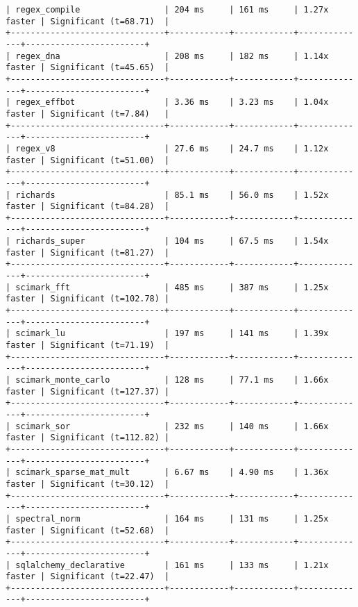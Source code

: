 \begin{code}
\begin{verbatim}
| regex_compile                 | 204 ms     | 161 ms     | 1.27x faster | Significant (t=68.71)  |
+-------------------------------+------------+------------+--------------+------------------------+
| regex_dna                     | 208 ms     | 182 ms     | 1.14x faster | Significant (t=45.65)  |
+-------------------------------+------------+------------+--------------+------------------------+
| regex_effbot                  | 3.36 ms    | 3.23 ms    | 1.04x faster | Significant (t=7.84)   |
+-------------------------------+------------+------------+--------------+------------------------+
| regex_v8                      | 27.6 ms    | 24.7 ms    | 1.12x faster | Significant (t=51.00)  |
+-------------------------------+------------+------------+--------------+------------------------+
| richards                      | 85.1 ms    | 56.0 ms    | 1.52x faster | Significant (t=84.28)  |
+-------------------------------+------------+------------+--------------+------------------------+
| richards_super                | 104 ms     | 67.5 ms    | 1.54x faster | Significant (t=81.27)  |
+-------------------------------+------------+------------+--------------+------------------------+
| scimark_fft                   | 485 ms     | 387 ms     | 1.25x faster | Significant (t=102.78) |
+-------------------------------+------------+------------+--------------+------------------------+
| scimark_lu                    | 197 ms     | 141 ms     | 1.39x faster | Significant (t=71.19)  |
+-------------------------------+------------+------------+--------------+------------------------+
| scimark_monte_carlo           | 128 ms     | 77.1 ms    | 1.66x faster | Significant (t=127.37) |
+-------------------------------+------------+------------+--------------+------------------------+
| scimark_sor                   | 232 ms     | 140 ms     | 1.66x faster | Significant (t=112.82) |
+-------------------------------+------------+------------+--------------+------------------------+
| scimark_sparse_mat_mult       | 6.67 ms    | 4.90 ms    | 1.36x faster | Significant (t=30.12)  |
+-------------------------------+------------+------------+--------------+------------------------+
| spectral_norm                 | 164 ms     | 131 ms     | 1.25x faster | Significant (t=52.68)  |
+-------------------------------+------------+------------+--------------+------------------------+
| sqlalchemy_declarative        | 161 ms     | 133 ms     | 1.21x faster | Significant (t=22.47)  |
+-------------------------------+------------+------------+--------------+------------------------+

\end{verbatim}
\end{code}
